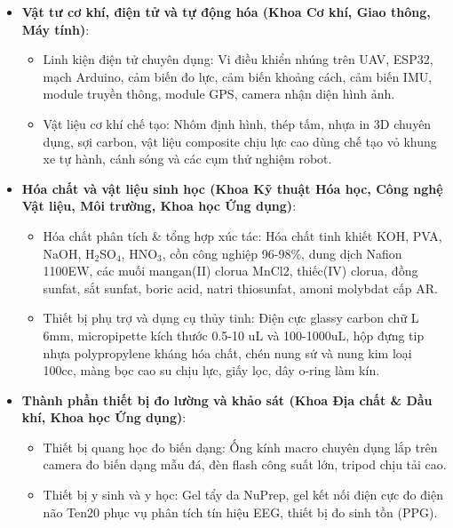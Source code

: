\documentclass[11pt,a4paper]{article}
\providecommand{\tightlist}{%
  \setlength{\itemsep}{0pt}\setlength{\parskip}{0pt}}
\begin{document}
\begin{itemize}
\tightlist
\item
  \textbf{Vật tư cơ khí, điện tử và tự động hóa (Khoa Cơ khí, Giao
  thông, Máy tính)}:

  \begin{itemize}
  \tightlist
  \item
    Linh kiện điện tử chuyên dụng: Vi điều khiển nhúng trên UAV, ESP32,
    mạch Arduino, cảm biến đo lực, cảm biến khoảng cách, cảm biến IMU,
    module truyền thông, module GPS, camera nhận diện hình ảnh.
  \item
    Vật liệu cơ khí chế tạo: Nhôm định hình, thép tấm, nhựa in 3D chuyên
    dụng, sợi carbon, vật liệu composite chịu lực cao dùng chế tạo vỏ
    khung xe tự hành, cánh sóng và các cụm thử nghiệm robot.
  \end{itemize}
\item
  \textbf{Hóa chất và vật liệu sinh học (Khoa Kỹ thuật Hóa học, Công
  nghệ Vật liệu, Môi trường, Khoa học Ứng dụng)}:

  \begin{itemize}
  \tightlist
  \item
    Hóa chất phân tích \& tổng hợp xúc tác: Hóa chất tinh khiết KOH,
    PVA, NaOH, H$_2$SO$_4$, HNO$_3$, cồn công nghiệp 96-98\%, dung dịch Nafion
    1100EW, các muối mangan(II) clorua MnCl2, thiếc(IV) clorua, đồng
    sunfat, sắt sunfat, boric acid, natri thiosunfat, amoni molybdat cấp
    AR.
  \item
    Thiết bị phụ trợ và dụng cụ thủy tinh: Điện cực glassy carbon chữ L
    6mm, micropipette kích thước 0.5-10 uL và 100-1000uL, hộp đựng tip
    nhựa polypropylene kháng hóa chất, chén nung sứ và nung kim loại
    100cc, màng bọc cao su chịu lực, giấy lọc, dây o-ring làm kín.
  \end{itemize}
\item
  \textbf{Thành phần thiết bị đo lường và khảo sát (Khoa Địa chất \& Dầu
  khí, Khoa học Ứng dụng)}:

  \begin{itemize}
  \tightlist
  \item
    Thiết bị quang học đo biến dạng: Ống kính macro chuyên dụng lắp trên
    camera đo biến dạng mẫu đá, đèn flash công suất lớn, tripod chịu tải
    cao.
  \item
    Thiết bị y sinh và y học: Gel tẩy da NuPrep, gel kết nối điện cực đo
    điện não Ten20 phục vụ phân tích tín hiệu EEG, thiết bị đo sinh tồn
    (PPG).
  \end{itemize}
\end{itemize}
\end{document}
